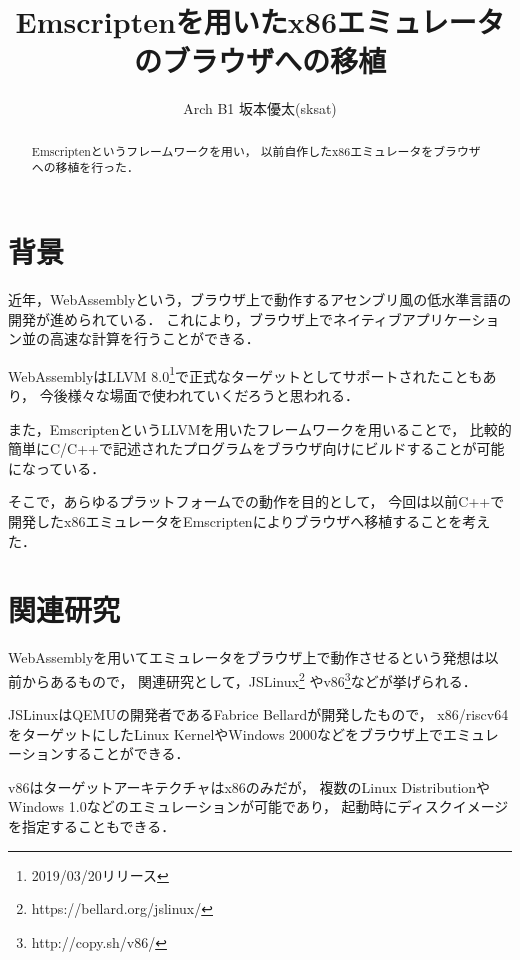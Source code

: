 \documentclass[a4j,10pt]{jsarticle}
\begin{document}

\title{Emscriptenを用いたx86エミュレータのブラウザへの移植}

\author{
	Arch B1 坂本優太(sksat)
}


\begin{abstract}
Emscriptenというフレームワークを用い，
以前自作したx86エミュレータをブラウザへの移植を行った．
\end{abstract}

\maketitle
\thispagestyle{empty}

\section{背景}
近年，WebAssemblyという，ブラウザ上で動作するアセンブリ風の低水準言語の開発が進められている．
これにより，ブラウザ上でネイティブアプリケーション並の高速な計算を行うことができる．

WebAssemblyはLLVM 8.0\footnote{2019/03/20リリース}で正式なターゲットとしてサポートされたこともあり，
今後様々な場面で使われていくだろうと思われる．

また，EmscriptenというLLVMを用いたフレームワークを用いることで，
比較的簡単にC/C++で記述されたプログラムをブラウザ向けにビルドすることが可能になっている．

そこで，あらゆるプラットフォームでの動作を目的として，
今回は以前C++で開発したx86エミュレータをEmscriptenによりブラウザへ移植することを考えた．

\section{関連研究}
WebAssemblyを用いてエミュレータをブラウザ上で動作させるという発想は以前からあるもので，
関連研究として，JSLinux\footnote{https://bellard.org/jslinux/}
やv86\footnote{http://copy.sh/v86/}などが挙げられる．

JSLinuxはQEMUの開発者であるFabrice Bellardが開発したもので，
x86/riscv64をターゲットにしたLinux KernelやWindows 2000などをブラウザ上でエミュレーションすることができる．

v86はターゲットアーキテクチャはx86のみだが，
複数のLinux DistributionやWindows 1.0などのエミュレーションが可能であり，
起動時にディスクイメージを指定することもできる．
\end{document}
